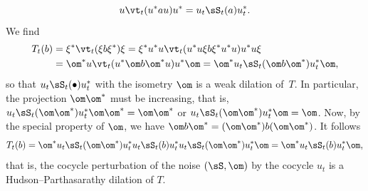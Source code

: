 \[
u\vt_t(u^*au)u^*=u_t\sS_t(a)u_t^*.
\]
We find
\begin{align*}
T_t(b) & = \xi^*\vt_t(\xi b\xi^*)\xi=\xi^*u^*u\vt_t(u^*u\xi b\xi^*u^*u)u^*u\xi\\
& = \om^*u\vt_t(u^*\om b\om^*u)u^*\om=\om^*u_t\sS_t(\om b\om^*)u_t^*\om,
\end{align*}
so that $u_t\sS_t(\bullet)u_t^*$ with the isometry $\om$ is a weak dilation of~$T$. In particular, the projection $\om\om^*$ must be increasing, that is, $u_t\sS_t(\om\om^*)u_t^*\om\om^*=\om\om^*$ or $u_t\sS_t(\om\om^*)u_t^*\om=\om$. Now, by the special property of $\om$, we have $\om b\om^*=(\om\om^*)b(\om\om^*)$. It follows
\[
T_t(b)
=\om^*u_t\sS_t(\om \om^*)u_t^*u_t\sS_t(b)u_t^*u_t\sS_t(\om \om^*)u_t^*\om
=\om^*u_t\sS_t(b)u_t^*\om,
\]
that is, the cocycle perturbation of the noise $(\sS,\om)$ by the cocycle $u_t$ is a Hudson--Parthasarathy dilation of $T$.

